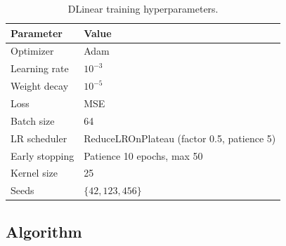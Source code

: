 \begin{table}[H]
\centering
\caption{DLinear training hyperparameters.}
\label{tab:dlinear-hparams}
\begin{tabular}{ll}
\toprule
\textbf{Parameter} & \textbf{Value} \\
\midrule
Optimizer      & Adam \\
Learning rate  & $10^{-3}$ \\
Weight decay   & $10^{-5}$ \\
Loss           & MSE \\
Batch size     & 64 \\
LR scheduler   & ReduceLROnPlateau (factor 0.5, patience 5) \\
Early stopping & Patience 10 epochs, max 50 \\
Kernel size    & 25 \\
Seeds          & $\{42, 123, 456\}$ \\
\bottomrule
\end{tabular}
\end{table}

\subsection{Algorithm}

